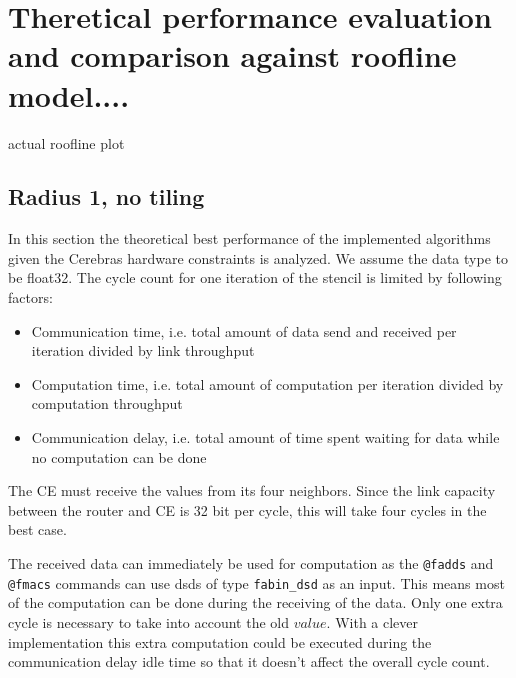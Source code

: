 \documentclass{article}
\begin{document}
        
            


\section{Theretical performance evaluation and comparison against roofline model....}
actual roofline plot
\subsection{Radius 1, no tiling}
In this section the theoretical best performance of the implemented algorithms given the Cerebras hardware constraints is analyzed.
We assume the data type to be float32.
The cycle count for one iteration of the stencil is limited by following factors:
\begin{itemize}
    \item Communication time, i.e. total amount of data send and received per iteration divided by link throughput
    \item Computation time, i.e. total amount of computation per iteration divided by computation throughput
    \item Communication delay, i.e. total amount of time spent waiting for data while no computation can be done
\end{itemize}
The CE must receive the values from its four neighbors. Since the link capacity between the router and CE is 32 bit per cycle, this will take four cycles in the best case.

The received data can immediately be used for computation as the \texttt{@fadds} and \texttt{@fmacs} commands can use dsds of type \texttt{fabin\_dsd} as an input. This means most of the computation can be done during the receiving of the data. Only one extra cycle is necessary to take into account the old $value$. With a clever implementation this extra computation could be executed during the communication delay idle time so that it doesn't affect the overall cycle count.
\end{document}
